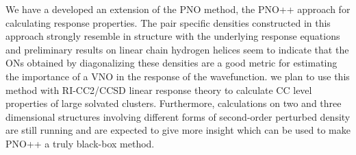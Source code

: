 We have a developed an extension of the PNO method, the PNO++
approach for calculating response properties. The pair
specific densities constructed in this approach strongly
resemble in structure with the underlying response equations
and preliminary results on linear chain hydrogen helices
seem to indicate that the ONs obtained by diagonalizing these densities
are a good metric for estimating the importance of a
VNO in the response of the wavefunction. we plan to use this
method with RI-CC2/CCSD linear response theory to calculate
CC level properties of large solvated clusters.
Furthermore, calculations on two and three dimensional structures
involving different forms of second-order perturbed density
are still running and are expected to give more insight
which can be used to make PNO++ a truly black-box method.
